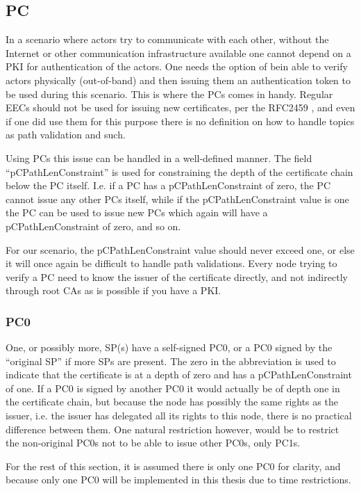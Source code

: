 \subsection{\acf{PC}}
In a scenario where actors try to communicate with each other, without the
Internet or other communication infrastructure available one cannot depend on a
\ac{PKI} for authentication of the actors. One needs the option of bein able to
verify actors physically (out-of-band) and then issuing them an authentication
token to be used during this scenario. This is where the \aclp{PC} comes in
handy. Regular \acp{EEC} should not be used for issuing new certificates, per
the RFC2459 \cite{rfc2459}, and even if one did use them for this purpose there
is no definition on how to handle topics as path validation and such.

Using \acp{PC} this issue can be handled in a well-defined manner. The field
``pCPathLenConstraint'' is used for constraining the depth of the certificate
chain below the \ac{PC} itself. I.e. if a \ac{PC} has a pCPathLenConstraint of
zero, the \ac{PC} cannot issue any other \acp{PC} itself, while if the 
pCPathLenConstraint value is one the \ac{PC} can be used to issue new \acp{PC}
which again will have a pCPathLenConstraint of zero, and so on.

For our scenario, the pCPathLenConstraint value should never exceed one, or else
it will once again be difficult to handle path validations. Every node trying to
verify a \ac{PC} need to know the issuer of the certificate directly, and not
indirectly through root \acp{CA} as is possible if you have a \ac{PKI}.

\subsubsection*{\acf{PC0}}
One, or possibly more, \ac{SP}(s) have a self-signed \ac{PC0}, or a \ac{PC0}
signed by the ``original \ac{SP}'' if more \acp{SP} are present. The zero in the
abbreviation is used to indicate that the certificate is at a depth of zero and
has a pCPathLenConstraint of one. If a \ac{PC0} is signed by another \ac{PC0}
it would actually be of depth one in the certificate chain, but because the node
has possibly the same rights as the issuer, i.e. the issuer has delegated all
its rights to this node, there is no practical difference between them. One
natural restriction however, would be to restrict the non-original \acp{PC0}
not to be able to issue other \acp{PC0}, only \acp{PC1}.

For the rest of this section, it is assumed there is only one \ac{PC0} for
clarity, and because only one \ac{PC0} will be implemented in this thesis due to
time restrictions.

